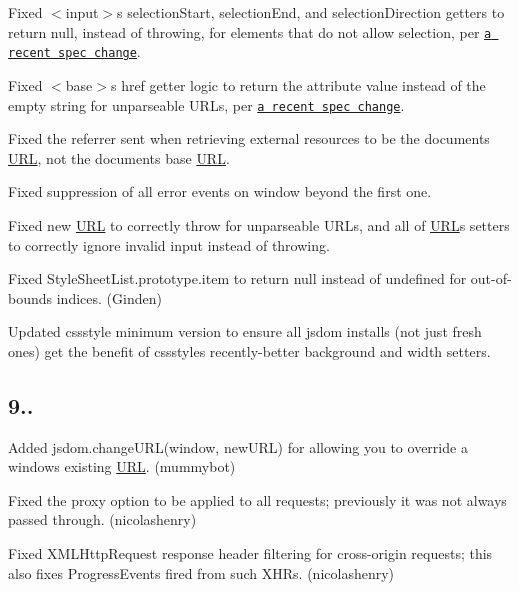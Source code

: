 \begin{DoxyItemize}
\item Fixed {\ttfamily $<$input$>$}\textquotesingle{}s {\ttfamily selection\+Start}, {\ttfamily selection\+End}, and {\ttfamily selection\+Direction} getters to return null, instead of throwing, for elements that do not allow selection, per \href{https://github.com/whatwg/html/pull/1006}{\tt a recent spec change}.
\item Fixed {\ttfamily $<$base$>$}\textquotesingle{}s {\ttfamily href} getter logic to return the attribute value instead of the empty string for unparseable U\+R\+Ls, per \href{https://github.com/whatwg/html/pull/1064}{\tt a recent spec change}.
\item Fixed the referrer sent when retrieving external resources to be the document\textquotesingle{}s \mbox{\hyperlink{namespace_u_r_l}{U\+RL}}, not the document\textquotesingle{}s base \mbox{\hyperlink{namespace_u_r_l}{U\+RL}}.
\item Fixed suppression of all {\ttfamily error} events on {\ttfamily window} beyond the first one.
\item Fixed {\ttfamily new \mbox{\hyperlink{namespace_u_r_l}{U\+RL}}} to correctly throw for unparseable U\+R\+Ls, and all of {\ttfamily \mbox{\hyperlink{namespace_u_r_l}{U\+RL}}}\textquotesingle{}s setters to correctly ignore invalid input instead of throwing.
\item Fixed {\ttfamily Style\+Sheet\+List.\+prototype.\+item} to return {\ttfamily null} instead of {\ttfamily undefined} for out-\/of-\/bounds indices. (Ginden)
\item Updated {\ttfamily cssstyle} minimum version to ensure all jsdom installs (not just fresh ones) get the benefit of {\ttfamily cssstyle}\textquotesingle{}s recently-\/better {\ttfamily background} and {\ttfamily width} setters.
\end{DoxyItemize}

\subsection*{9..}


\begin{DoxyItemize}
\item Added {\ttfamily jsdom.\+change\+U\+R\+L(window, new\+U\+R\+L)} for allowing you to override a window\textquotesingle{}s existing \mbox{\hyperlink{namespace_u_r_l}{U\+RL}}. (mummybot)
\item Fixed the {\ttfamily proxy} option to be applied to all requests; previously it was not always passed through. (nicolashenry)
\item Fixed {\ttfamily X\+M\+L\+Http\+Request} response header filtering for cross-\/origin requests; this also fixes {\ttfamily Progress\+Event}s fired from such X\+H\+Rs. (nicolashenry)
\end{DoxyItemize}

